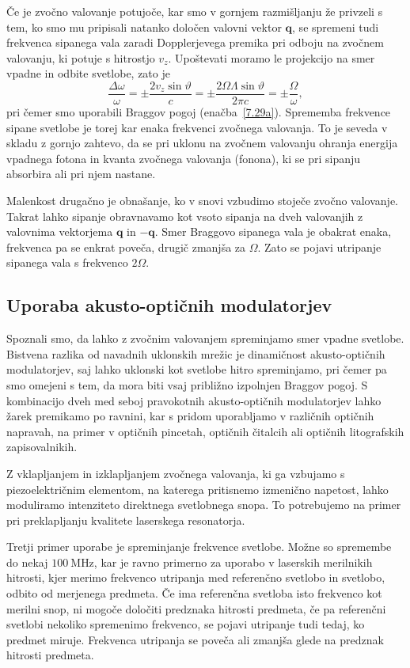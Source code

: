 Če je zvočno valovanje potujoče, kar smo v gornjem razmišljanju že privzeli
s tem, ko smo mu pripisali natanko določen valovni vektor $\mathbf{q}$,
se spremeni tudi frekvenca sipanega vala zaradi Dopplerjevega premika
pri odboju na zvočnem valovanju, ki potuje s hitrostjo $v_{z}$. Upoštevati
moramo le projekcijo na smer vpadne in odbite svetlobe, zato je 
\begin{equation}
\frac{\Delta\omega}{\omega}=\pm\frac{2v_{z}\sin\vartheta}{c}=
\pm\frac{2\Omega\Lambda\sin\vartheta}{2 \pi c}=\pm\frac{\Omega}{\omega},
\label{7.32}
\end{equation}
pri čemer smo uporabili Braggov pogoj (enačba~\ref{7.29a}). Sprememba frekvence
sipane svetlobe je torej kar enaka frekvenci zvočnega valovanja. To je seveda v skladu 
z gornjo zahtevo, da se pri uklonu na zvočnem valovanju ohranja energija
vpadnega fotona in kvanta zvočnega valovanja (fonona), ki se pri sipanju 
absorbira ali pri njem nastane.

Malenkost drugačno je obnašanje, ko v snovi vzbudimo stoječe zvočno valovanje. 
Takrat lahko sipanje obravnavamo kot vsoto sipanja na dveh valovanjih z valovnima 
vektorjema $\mathbf{q}$ in $-\mathbf{q}$. Smer Braggovo sipanega vala je obakrat enaka, 
frekvenca pa se enkrat poveča, drugič zmanjša za $\Omega$. Zato se pojavi utripanje
sipanega vala s frekvenco $2\Omega$.

\subsection*{Uporaba akusto-optičnih modulatorjev}
Spoznali smo, da lahko z zvočnim valovanjem spreminjamo smer vpadne svetlobe.
Bistvena razlika od navadnih uklonskih mrežic je dinamičnost akusto-optičnih modulatorjev, 
saj lahko uklonski kot svetlobe hitro spreminjamo, pri čemer pa smo omejeni s 
tem, da mora biti vsaj približno izpolnjen Braggov pogoj. S kombinacijo dveh med seboj 
pravokotnih akusto-optičnih modulatorjev lahko žarek 
premikamo po ravnini, kar s pridom uporabljamo v različnih optičnih napravah, 
na primer v optičnih pincetah, optičnih čitalcih ali 
optičnih litografskih zapisovalnikih.

Z vklapljanjem in izklapljanjem zvočnega valovanja, ki ga vzbujamo s piezoelektričnim elementom,
na katerega pritisnemo izmenično napetost, lahko moduliramo intenziteto
direktnega svetlobnega snopa. To potrebujemo na primer pri preklapljanju
kvalitete laserskega resonatorja.

Tretji primer uporabe je spreminjanje frekvence svetlobe. Možne so spremembe
do nekaj $100~\si{\mega\hertz}$, kar je ravno primerno za uporabo v laserskih merilnikih
hitrosti, kjer merimo frekvenco utripanja med referenčno svetlobo in svetlobo, odbito od
merjenega predmeta. Če ima referenčna svetloba
isto frekvenco kot merilni snop, ni mogoče določiti predznaka hitrosti
predmeta, če pa referenčni svetlobi nekoliko spremenimo frekvenco,
se pojavi utripanje tudi tedaj, ko predmet miruje. Frekvenca utripanja
se poveča ali zmanjša glede na predznak hitrosti predmeta.

